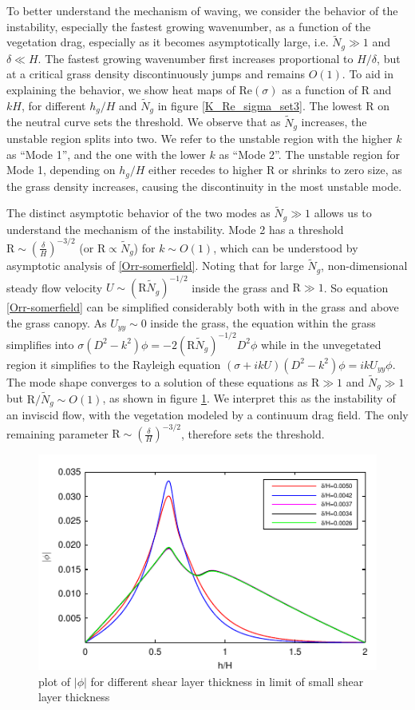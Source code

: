 \documentclass[aps,prl,twocolumn,showpacs,superscriptaddress,groupedaddress,10pt]{revtex4-1}  %
\newcommand{\hg}{h_g}
\newcommand{\Rey}{\text{R}}
\newcommand{\Ndg}{\tilde{N}_g}
\begin{document}
To better understand the mechanism of waving, we consider the behavior of the instability, especially the fastest growing wavenumber, as a function of the vegetation drag, especially as it becomes asymptotically large, i.e. $\Ndg \gg 1$ and $\delta \ll H$. The fastest growing wavenumber first increases proportional to $H/\delta$, but at a critical grass density discontinuously jumps and remains $O(1)$. To aid in explaining the behavior, we show heat maps of Re$(\sigma)$ as a function of $\Rey$ and $kH$, for different $\hg/H$ and $\Ndg$ in figure \ref{K_Re_sigma_set3}. The lowest $\Rey$ on the neutral curve sets the threshold. We observe that as $\Ndg$ increases, the unstable region splits into two. We refer to the unstable region with the higher $k$ as ``Mode 1'', and the one with the lower $k$ as ``Mode 2''. The unstable region for Mode 1, depending on $\hg/H$ either recedes to higher $\Rey$ or shrinks to zero size, as the grass density increases, causing the discontinuity in the most unstable mode.

The distinct asymptotic behavior of the two modes as $\Ndg \gg 1$ allows us to understand the mechanism of the instability. Mode 2 has a threshold $\Rey \sim (\frac{\delta}{H})^{-3/2}$ (or $\Rey \propto \Ndg$) for $k\sim O(1)$, which can be understood by asymptotic analysis of \eqref{Orr-somerfield}.
Noting that for large $\Ndg$, non-dimensional steady flow velocity $U \sim (\Rey \Ndg)^{-1/2}$ inside the grass and $\Rey \gg 1$. So equation \eqref{Orr-somerfield}
can be simplified considerably both with in the grass and above the grass canopy. As $U_{yy}\sim 0$ inside the grass, the equation within the grass simplifies into
$\sigma\left(D^2-k^2\right)\phi = -2{(\Rey\Ndg)^{-1/2}}D^2\phi$ while in the unvegetated region it simplifies to the Rayleigh equation 
$ \left(\sigma+ikU\right) \left(D^2-k^2\right)\phi =  ikU_{yy}\phi$. The mode shape converges to a solution of these equations as $\Rey\gg 1$ and $\Ndg \gg 1$ but $\Rey/\Ndg \sim O(1)$, as shown in figure \ref{Asymptotic_mode}. We interpret this as the instability of an inviscid flow, with the vegetation modeled by a continuum drag field. The only remaining parameter $\Rey \sim (\frac{\delta}{H})^{-3/2}$, therefore sets the threshold.


\begin{figure}[]
\includegraphics[]{Asymptotic_eig_set3.pdf}
\caption{plot of $|\phi|$ for different shear layer thickness in limit of small shear layer thickness}
\label{Asymptotic_mode}
\end{figure}
\end{document}
